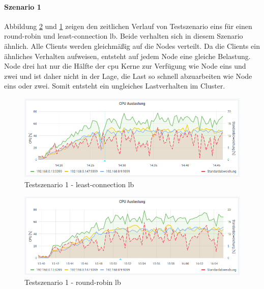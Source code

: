 \paragraph{Szenario 1}
Abbildung \ref{fig:s1-rr} und \ref{fig:s1-lc} zeigen den zeitlichen Verlauf von Testszenario eins für einen round-robin und least-connection \acl{lb}.
Beide verhalten sich in diesem Szenario ähnlich. Alle Clients werden gleichmä{\ss}ig auf die Nodes verteilt.
Da die Clients ein ähnliches Verhalten aufweisen, entsteht auf jedem Node eine gleiche Belastung. Node drei hat nur die Hälfte der \ac{cpu} Kerne zur Verfügung wie Node eins und zwei und ist daher nicht in der Lage, die Last so schnell abzuarbeiten wie Node eins oder zwei. Somit entsteht ein ungleiches Lastverhalten im Cluster.
\begin{figure}[h]
    \centering
    \includegraphics[scale=0.8]{images/s1_lc.png}
    \caption{Testszenario 1 - least-connection \acl{lb}}
    \label{fig:s1-lc}
\end{figure}
\begin{figure}[h]
    \centering
    \includegraphics[scale=0.8]{images/s1_rr.png}
    \caption{Testszenario 1 - round-robin \acl{lb}}
    \label{fig:s1-rr}
\end{figure}

